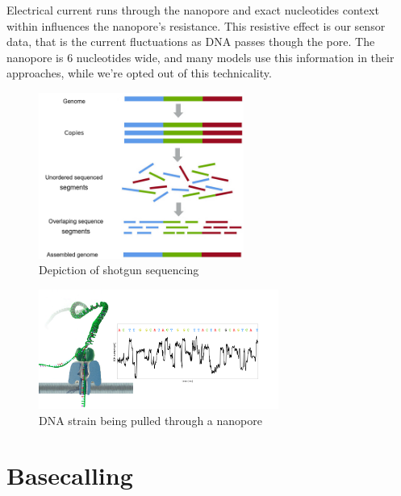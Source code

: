 \documentclass[runningheads,a4paper]{llncs}
\begin{document}
Electrical current runs through the nanopore and exact nucleotides context within influences the nanopore's resistance. This resistive effect is our sensor data, that is the current fluctuations as DNA passes though the pore. The nanopore is 6 nucleotides wide, and many models use this information in their approaches, while we're opted out of this technicality.

\begin{figure}[!ht]
	\begin{center}
		\includegraphics[width=0.6\textwidth]{./imgs/sequencing.png}
		\caption{Depiction of shotgun sequencing}
		\label{fg:sequencing}
	\end{center}
\end{figure}

\begin{figure}[!ht]
	\begin{center}
		\includegraphics[width=0.7\textwidth]{./imgs/nanopore.png}
		\caption[DNA strain being pulled through a nanopore]{DNA strain being pulled through a nanopore \protect\footnotemark}
		\label{fg:nanopore}
	\end{center}
\end{figure}

\section{Basecalling}
\end{document}
